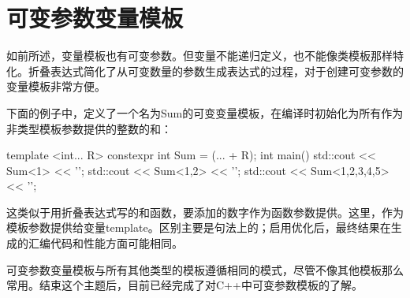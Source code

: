 \section{可变参数变量模板}
如前所述，变量模板也有可变参数。但变量不能递归定义，也不能像类模板那样特化。折叠表达式简化了从可变数量的参数生成表达式的过程，对于创建可变参数的变量模板非常方便。

下面的例子中，定义了一个名为Sum的可变变量模板，在编译时初始化为所有作为非类型模板参数提供的整数的和：

\begin{cpp}
template <int... R>
constexpr int Sum = (... + R);
int main()
{
	std::cout << Sum<1> << '\n';
	std::cout << Sum<1,2> << '\n';
	std::cout << Sum<1,2,3,4,5> << '\n';
}
\end{cpp}

这类似于用折叠表达式写的和函数，要添加的数字作为函数参数提供。这里，作为模板参数提供给变量template。区别主要是句法上的；启用优化后，最终结果在生成的汇编代码和性能方面可能相同。

可变参数变量模板与所有其他类型的模板遵循相同的模式，尽管不像其他模板那么常用。结束这个主题后，目前已经完成了对C++中可变参数模板的了解。
















































